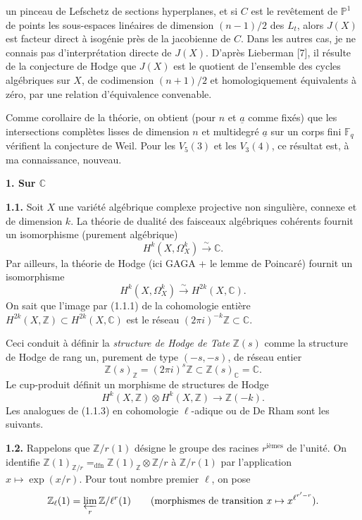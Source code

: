 \documentclass[10pt]{article}
\newcommand{\C}{\mathbb C}
\newcommand{\F}{\mathbb F}
\newcommand{\Pj}{\mathbb P}
\newcommand{\Z}{\mathbb Z}
\newcommand{\iso}{\xrightarrow{\sim}}
\newcommand{\dfneq}{\mathrel{=_{\mathrm{dfn}}}}
\newcommand{\sourcebreak}{\clearpage}
\begin{document}
\sourcebreak
un pinceau de Lefschetz de sections hyperplanes, et si \(C\) est le revêtement de \(\Pj^1\) de points les sous-espaces linéaires de dimension \((n-1)/2\) des \(L_t\), alors \(J(X)\) est facteur direct à isogénie près de la jacobienne de \(C\). Dans les autres cas, je ne connais pas d'interprétation directe de \(J(X)\). D'après Lieberman [7], il résulte de la conjecture de Hodge que \(J(X)\) est le quotient de l'ensemble des cycles algébriques sur \(X\), de codimension \((n+1)/2\) et homologiquement équivalents à zéro, par une relation d'équivalence convenable.

Comme corollaire de la théorie, on obtient (pour \(n\) et \(\underline a\) comme fixés) que les intersections complètes lisses de dimension \(n\) et multidegré \(\underline a\) sur un corps fini \(\F_q\) vérifient la conjecture de Weil. Pour les \(V_5(3)\) et les \(V_3(4)\), ce résultat est, à ma connaissance, nouveau.

\begin{center}\bfseries 1. Sur \(\C\)\end{center}

\noindent\textbf{1.1.} Soit \(X\) une variété algébrique complexe projective non singulière, connexe et de dimension \(k\). La théorie de dualité des faisceaux algébriques cohérents fournit un isomorphisme (purement algébrique)
\[
\tag{1.1.1}
H^k(X,\Omega_X^k)\iso\C.
\]
Par ailleurs, la théorie de Hodge (ici GAGA + le lemme de Poincaré) fournit un isomorphisme
\[
\tag{1.1.2}
H^k(X,\Omega_X^k)\iso H^{2k}(X,\C).
\]
On sait que l'image par (1.1.1) de la cohomologie entière \(H^{2k}(X,\Z)\subset H^{2k}(X,\C)\) est le réseau \((2\pi i)^{-k}\Z\subset\C\).

Ceci conduit à définir la \emph{structure de Hodge de Tate} \(\Z(s)\) comme la structure de Hodge de rang un, purement de type \((-s,-s)\), de réseau entier
\[
\Z(s)_\Z=(2\pi i)^s\Z\subset\Z(s)_\C=\C.
\]
Le cup-produit définit un morphisme de structures de Hodge
\[
\tag{1.1.3}
H^k(X,\Z)\otimes H^k(X,\Z)\longrightarrow\Z(-k).
\]
Les analogues de (1.1.3) en cohomologie \(\ell\)-adique ou de De Rham sont les suivants.

\noindent\textbf{1.2.} Rappelons que \(\Z/r(1)\) désigne le groupe des racines \(r^{\text{ièmes}}\) de l'unité. On identifie \(\Z(1)_{\Z/r}\dfneq\Z(1)_\Z\otimes\Z/r\) à \(\Z/r(1)\) par l'application \(x\mapsto\exp(x/r)\). Pour tout nombre premier \(\ell\), on pose
\[
\Z_\ell(1)=\varprojlim_r\Z/\ell^r(1)
\qquad\text{(morphismes de transition \(x\mapsto x^{\ell^{r'-r}}\)).}
\]
\end{document}
